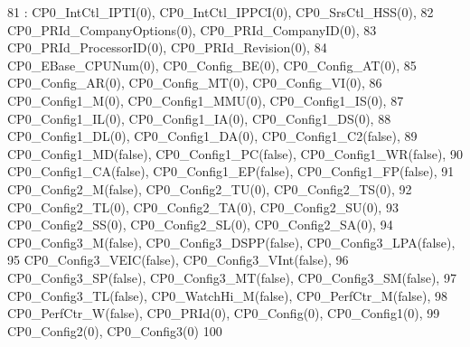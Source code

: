 \begin{DoxyCode}
81         : CP0_IntCtl_IPTI(0), CP0_IntCtl_IPPCI(0), CP0_SrsCtl_HSS(0),
82           CP0_PRId_CompanyOptions(0), CP0_PRId_CompanyID(0),
83           CP0_PRId_ProcessorID(0), CP0_PRId_Revision(0),
84           CP0_EBase_CPUNum(0), CP0_Config_BE(0), CP0_Config_AT(0),
85           CP0_Config_AR(0), CP0_Config_MT(0), CP0_Config_VI(0),
86           CP0_Config1_M(0), CP0_Config1_MMU(0), CP0_Config1_IS(0),
87           CP0_Config1_IL(0), CP0_Config1_IA(0), CP0_Config1_DS(0),
88           CP0_Config1_DL(0), CP0_Config1_DA(0), CP0_Config1_C2(false),
89           CP0_Config1_MD(false), CP0_Config1_PC(false), CP0_Config1_WR(false),
90           CP0_Config1_CA(false), CP0_Config1_EP(false), CP0_Config1_FP(false),
91           CP0_Config2_M(false), CP0_Config2_TU(0), CP0_Config2_TS(0),
92           CP0_Config2_TL(0), CP0_Config2_TA(0), CP0_Config2_SU(0),
93           CP0_Config2_SS(0), CP0_Config2_SL(0), CP0_Config2_SA(0),
94           CP0_Config3_M(false), CP0_Config3_DSPP(false), CP0_Config3_LPA(false),
95           CP0_Config3_VEIC(false), CP0_Config3_VInt(false),
96           CP0_Config3_SP(false), CP0_Config3_MT(false), CP0_Config3_SM(false),
97           CP0_Config3_TL(false), CP0_WatchHi_M(false), CP0_PerfCtr_M(false),
98           CP0_PerfCtr_W(false), CP0_PRId(0), CP0_Config(0), CP0_Config1(0),
99           CP0_Config2(0), CP0_Config3(0)
100     { }
\end{DoxyCode}


